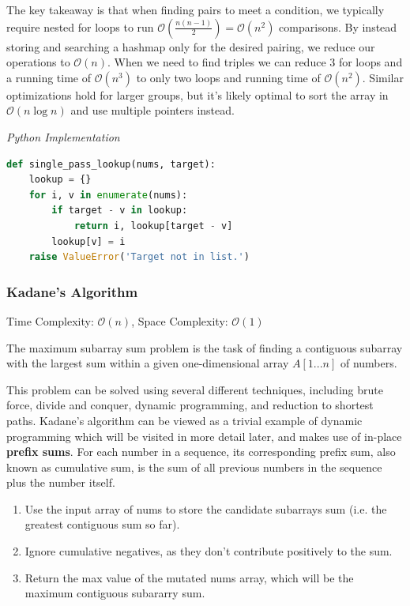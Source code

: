 \documentclass{article}
\newcommand{\bigO}{\mathcal{O}}
\begin{document}
    The key takeaway is that when finding pairs to meet a condition, we typically require nested for loops to run $\bigO(\frac{n(n-1)}{2}) = \bigO(n^2)$ comparisons. By instead storing and searching a hashmap only for the desired pairing, we reduce our operations to $\bigO(n)$. When we need to find triples we can reduce 3 for loops and a running time of $\bigO(n^3)$ to only two loops and running time of $\bigO(n^2)$. Similar  optimizations hold for larger groups, but it's likely optimal to sort the array in $\bigO(n \log n)$ and use multiple pointers instead. 


\vspace{8pt} \emph{Python Implementation}
\begin{lstlisting}[language=Python]
def single_pass_lookup(nums, target):
    lookup = {}
    for i, v in enumerate(nums):
        if target - v in lookup:
            return i, lookup[target - v]
        lookup[v] = i
    raise ValueError('Target not in list.')
\end{lstlisting}

    \subsubsection{Kadane's Algorithm}
    Time Complexity: $\bigO(n)$, Space Complexity: $\bigO(1)$
    
    The maximum subarray sum problem is the task of finding a contiguous subarray with the largest sum within a given one-dimensional array $A[1...n]$ of numbers.
    
    This problem can be solved using several different techniques, including brute force, divide and conquer, dynamic programming, and reduction to shortest paths. Kadane's algorithm can be viewed as a trivial example of dynamic programming which will be visited in more detail later, and makes use of in-place \textbf{prefix sums}. For each number in a sequence, its corresponding prefix sum, also known as cumulative sum, is the sum of all previous numbers in the sequence plus the number itself. 
    
    \begin{enumerate}
        \item Use the input array of nums to store the candidate subarrays sum (i.e. the greatest contiguous sum so far).
        \item Ignore cumulative negatives, as they don't contribute positively to the sum.
        \item Return the max value of the mutated nums array, which will be the maximum contiguous subararry sum.
    \end{enumerate} 
    
\end{document}
